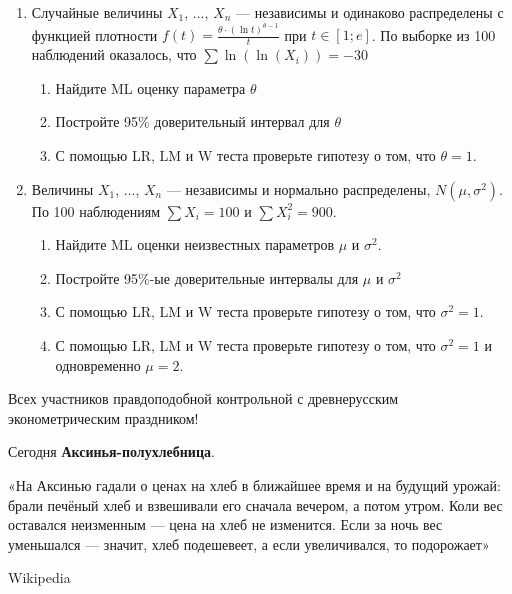 \documentclass[12pt, a4paper]{article}\usepackage[]{graphicx}\usepackage[]{color}
\begin{document}
\begin{enumerate}
\item  Случайные величины $X_{1}$, ..., $X_{n}$ — независимы и одинаково распределены с функцией плотности $f(t)=\frac{\theta \cdot\left(\ln  t\right)^{\theta -1}}{t} $  при  $t\in
\left[1;e\right]$. По выборке из 100 наблюдений оказалось, что $\sum{\ln(\ln(X_{i}))}=-30$
\begin{enumerate}
\item Найдите ML оценку параметра $\theta$
\item Постройте 95\% доверительный интервал для $\theta$
\item С помощью LR, LM и W теста проверьте гипотезу о том, что $\theta=1$.
\end{enumerate}

\item Величины $X_{1}$, ..., $X_{n}$ — независимы и нормально распределены, $N(\mu,\sigma^2)$. По 100 наблюдениям $\sum X_i=100$ и  $\sum X_i^2=900$.
\begin{enumerate}
\item Найдите ML оценки неизвестных параметров $\mu$ и $\sigma^2$.
\item Постройте 95\%-ые доверительные интервалы для $\mu$ и $\sigma^2$
\item С помощью LR, LM и W теста проверьте гипотезу о том, что $\sigma^2=1$.
\item С помощью LR, LM и W теста проверьте гипотезу о том, что $\sigma^2=1$ и одновременно $\mu=2$.
\end{enumerate}

\end{enumerate}

Всех участников правдоподобной контрольной с древнерусским эконометрическим праздником!

\vspace{20pt}

Сегодня \textbf{Аксинья-полухлебница}.

\vspace{20pt}

«На Аксинью гадали о ценах на хлеб в ближайшее время и на будущий урожай: брали печёный хлеб и взвешивали его сначала вечером, а потом утром. Коли вес оставался неизменным — цена на хлеб не изменится. Если за ночь вес уменьшался — значит, хлеб подешевеет, а если увеличивался, то подорожает»

\begin{flushright}
Wikipedia
\end{flushright}
\end{document}
